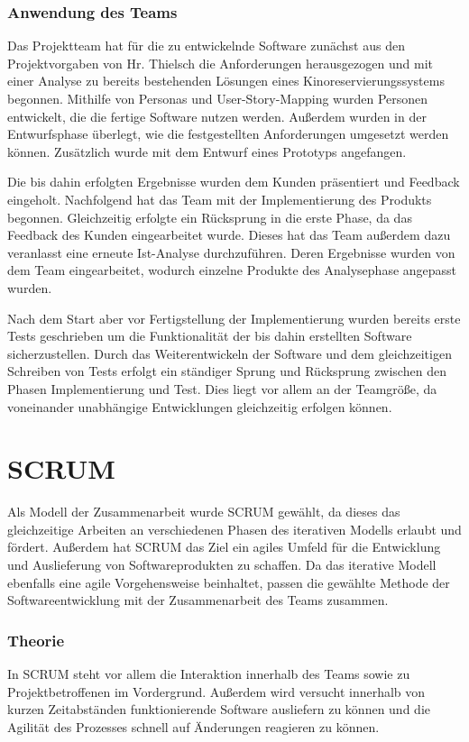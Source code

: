 \subsubsection{Anwendung des Teams}
Das Projektteam hat für die zu entwickelnde Software zunächst aus den Projektvorgaben von Hr. Thielsch die Anforderungen herausgezogen und mit einer Analyse zu bereits bestehenden Lösungen eines Kinoreservierungssystems begonnen. Mithilfe von Personas und User-Story-Mapping wurden Personen entwickelt, die die fertige Software nutzen werden. Außerdem wurden in der Entwurfsphase überlegt, wie die festgestellten Anforderungen umgesetzt werden können. Zusätzlich wurde mit dem Entwurf eines Prototyps angefangen. 

Die bis dahin erfolgten Ergebnisse wurden dem Kunden präsentiert und Feedback eingeholt. Nachfolgend hat das Team mit der Implementierung des Produkts begonnen. Gleichzeitig erfolgte ein Rücksprung in die erste Phase, da das Feedback des Kunden eingearbeitet wurde. Dieses hat das Team außerdem dazu veranlasst eine erneute Ist-Analyse durchzuführen. Deren Ergebnisse wurden von dem Team eingearbeitet, wodurch einzelne Produkte des Analysephase angepasst wurden. 

Nach dem Start aber vor Fertigstellung der Implementierung wurden bereits erste Tests geschrieben um die Funktionalität der bis dahin erstellten Software sicherzustellen. Durch das Weiterentwickeln der Software und dem gleichzeitigen Schreiben von Tests erfolgt ein ständiger Sprung und Rücksprung zwischen den Phasen Implementierung und Test. Dies liegt vor allem an der Teamgröße, da voneinander unabhängige Entwicklungen gleichzeitig erfolgen können. 


\section{SCRUM}
Als Modell der Zusammenarbeit wurde SCRUM gewählt, da dieses das gleichzeitige Arbeiten an verschiedenen Phasen des iterativen Modells erlaubt und fördert. Außerdem hat SCRUM das Ziel ein agiles Umfeld für die Entwicklung und Auslieferung von Softwareprodukten zu schaffen. Da das iterative Modell ebenfalls eine agile Vorgehensweise beinhaltet, passen die gewählte Methode der Softwareentwicklung mit der Zusammenarbeit des Teams zusammen. 

\subsubsection{Theorie}
In SCRUM steht vor allem die Interaktion innerhalb des Teams sowie zu Projektbetroffenen im Vordergrund. Außerdem wird versucht innerhalb von kurzen Zeitabständen funktionierende Software ausliefern zu können und die Agilität des Prozesses schnell auf Änderungen reagieren zu können. 

